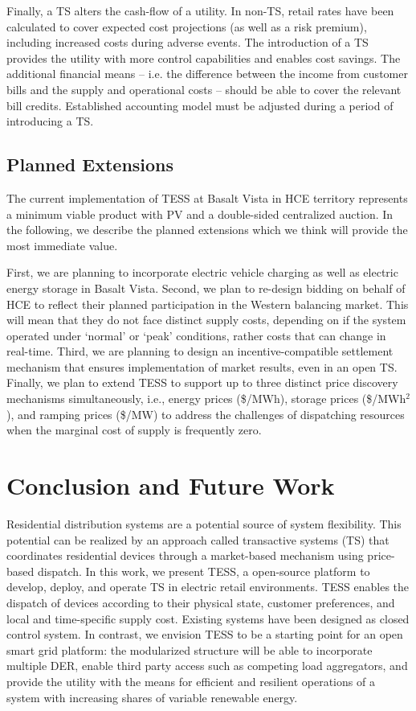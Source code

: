 \documentclass[12pt]{article}{Definitions/mdpi}
\begin{document}
Finally, a TS alters the cash-flow of a utility. In non-TS, retail rates have been calculated to cover expected cost projections (as well as a risk premium), including increased costs during adverse events. The introduction of a TS provides the utility with more control capabilities and enables cost savings. The additional financial means -- i.e. the difference between the income from customer bills and the supply and operational costs -- should be able to cover the relevant bill credits. 
Established accounting model must be adjusted during a period of introducing a TS.

\subsection{Planned Extensions}\label{sec:extensions}

The current implementation of TESS at Basalt Vista in HCE territory represents a minimum viable product with PV and a double-sided centralized auction. In the following, we describe the planned extensions which we think will provide the most immediate value.

First, we are planning to incorporate electric vehicle charging as well as electric energy storage in Basalt Vista. 
Second, we plan to re-design bidding on behalf of HCE to reflect their planned participation in the Western balancing market. This will mean that they do not face distinct supply costs, depending on if the system operated under `normal' or `peak' conditions, rather costs that can change in real-time.
Third, we are planning to design an incentive-compatible settlement mechanism that ensures implementation of market results, even in an open TS.
Finally, we plan to extend TESS to support up to three distinct price discovery mechanisms simultaneously, i.e., energy prices (\$/MWh), storage prices (\$/MWh$^2$), and ramping prices (\$/MW) to address the challenges of dispatching resources when the marginal cost of supply is frequently zero.


\section{Conclusion and Future Work}\label{sec:conclusion}

Residential distribution systems are a potential source of system flexibility. This potential can be realized by an approach called transactive systems (TS) that coordinates residential devices through a market-based mechanism using price-based dispatch.
In this work, we present TESS, a open-source platform to develop, deploy, and operate TS in electric retail environments. TESS enables the dispatch of devices according to their physical state, customer preferences, and local and time-specific supply cost. 
Existing systems have been designed as closed control system. In contrast, we envision TESS to be a starting point for an open smart grid platform: the modularized structure will be able to incorporate multiple DER, enable third party access such as competing load aggregators, and provide the utility with the means for efficient and resilient operations of a system with increasing shares of variable renewable energy.
\end{document}

